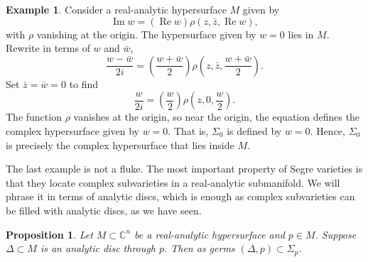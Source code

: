 \documentclass[12pt,openany]{book}
\renewcommand{\Re}{\operatorname{Re}}
\renewcommand{\Im}{\operatorname{Im}}
\newcommand{\C}{{\mathbb{C}}}
\theoremstyle{plain}
\newtheorem{prop}[thm]{Proposition}
\theoremstyle{remark}
\theoremstyle{definition}
\theoremstyle{exercise}
\theoremstyle{example}
\newtheorem{example}[thm]{Example}
\begin{document}
\begin{example}
Consider a real-analytic hypersurface $M$ given by
\begin{equation*}
\Im w = (\Re w) \rho(z,\bar{z},\Re w) ,
\end{equation*}
with $\rho$ vanishing at the origin.
The hypersurface given by $w=0$ lies in $M$.
Rewrite in terms of $w$ and $\bar{w}$,
\begin{equation*}
\frac{w-\bar{w}}{2i} = \left(\frac{w+\bar{w}}{2}\right)
\rho\left(z,\bar{z},\frac{w+\bar{w}}{2}\right) .
\end{equation*}
Set $\bar{z} = \bar{w} = 0$ to find
\begin{equation*}
\frac{w}{2i} = \left(\frac{w}{2}\right)
\rho\left(z,0,\frac{w}{2}\right) .
\end{equation*}
The function $\rho$ vanishes at the origin, so near the origin, the equation
defines the complex hypersurface given by $w=0$.
That is, $\Sigma_0$ is defined by $w = 0$.
Hence, $\Sigma_0$ is precisely the complex hypersurface that lies inside $M$.
\end{example}

The last example is not a fluke.
The most important property of Segre varieties is that they locate complex
subvarieties in a real-analytic submanifold.
We will phrase it in terms of analytic discs, which is
enough as complex subvarieties can be filled with analytic discs,
as we have seen.

\begin{prop}
Let $M \subset \C^n$ be a real-analytic hypersurface and $p \in M$.
Suppose $\Delta \subset M$ is an analytic disc
through $p$.  Then as germs $(\Delta,p) \subset \Sigma_p$.
\end{prop}
\end{document}
